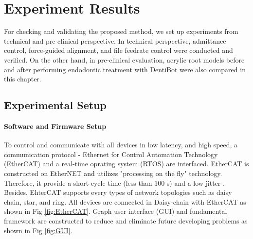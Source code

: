 \chapter{Experiment Results}
\label{chapter6}
\hspace*{6mm}For checking and validating the proposed method, we set up experiments from technical and pre-clinical perspective. In technical perspective, admittance control, force-guided alignment, and file feedrate control were conducted and verified. On the other hand, in pre-clinical evaluation, acrylic root models before and after performing endodontic treatment with DentiBot were also compared in this chapter. 
\section{Experimental Setup}
\subsubsection{Software and Firmware Setup}
\hspace*{6mm}To control and communicate with all devices in low latency, and high speed, a communication protocol - Ethernet for Control Automation Technology (EtherCAT) and a real-time oprating system (RTOS) are interfaced. EtherCAT is constructed on EtherNET and utilizes "processing on the fly" technology. Therefore, it provide a short cycle time (less than 100 \textmu s) and a low jitter \cite{web5}. Besides, EhterCAT supports every types of network topologies such as daisy chain, star, and ring. All devices are connected in Daisy-chain with EtherCAT as shown in Fig \ref{fig:EtherCAT}. Graph user interface (GUI) and fundamental framework are constructed to reduce and eliminate future developing problems as shown in Fig \ref{fig:GUI}.

